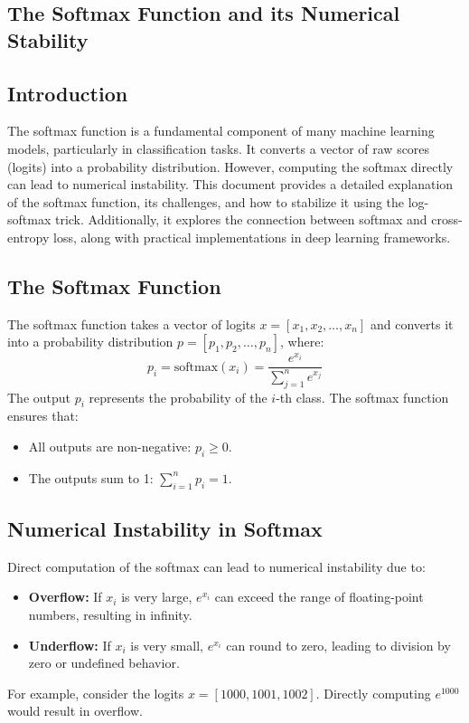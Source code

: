 \begin{notechapter}
\chapter{The Softmax Function and its Numerical Stability}\label{ch:log-softmax}

\section{Introduction}
The softmax function is a fundamental component of many machine learning 
models, particularly in classification tasks. It converts a vector of raw 
scores (logits) into a probability distribution. However, computing the 
softmax directly can lead to numerical instability. This document provides 
a detailed explanation of the softmax function, its challenges, and how to 
stabilize it using the log-softmax trick. Additionally, it explores the 
connection between softmax and cross-entropy loss, along with practical 
implementations in deep learning frameworks.

\section{The Softmax Function}
The softmax function takes a vector of logits \( x = [x_1, x_2, \dots, x_n] \) 
and converts it into a probability distribution \( p = [p_1, p_2, \dots, p_n] \), 
where:
\[
p_i = \text{softmax}(x_i) = \frac{e^{x_i}}{\sum_{j=1}^n e^{x_j}}
\]
The output \( p_i \) represents the probability of the \( i \)-th class. The 
softmax function ensures that:
\begin{itemize}
    \item All outputs are non-negative: \( p_i \geq 0 \).
    \item The outputs sum to 1: \( \sum_{i=1}^n p_i = 1 \).
\end{itemize}

\section{Numerical Instability in Softmax}
Direct computation of the softmax can lead to numerical instability due to:
\begin{itemize}
    \item \textbf{Overflow:} If \( x_i \) is very large, \( e^{x_i} \) can 
    exceed the range of floating-point numbers, resulting in infinity.
    \item \textbf{Underflow:} If \( x_i \) is very small, \( e^{x_i} \) can 
    round to zero, leading to division by zero or undefined behavior.
\end{itemize}
For example, consider the logits \( x = [1000, 1001, 1002] \). Directly 
computing \( e^{1000} \) would result in overflow.


\end{notechapter}
